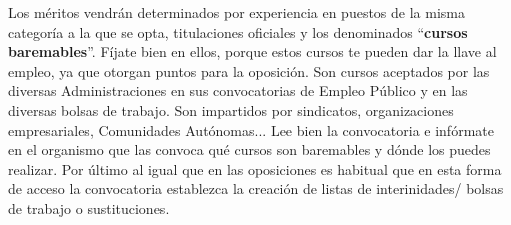 Los méritos vendrán determinados por experiencia en puestos de la misma categoría a la que se opta, titulaciones oficiales y los denominados ``\textbf{cursos baremables}''. Fíjate bien en ellos, porque estos cursos te pueden dar la llave al empleo, ya que otorgan puntos para la oposición. Son cursos aceptados por las diversas Administraciones en sus convocatorias de Empleo Público y en las diversas bolsas de trabajo. Son impartidos por sindicatos, organizaciones empresariales, Comunidades Autónomas... Lee bien la convocatoria e infórmate en el organismo que las convoca qué cursos son baremables y dónde los puedes realizar. Por último al igual que en las oposiciones es habitual que en esta forma de acceso la convocatoria establezca la creación de listas de interinidades/ bolsas de trabajo o sustituciones.


\glsaddall
\printglossaries

\newpage
{}



